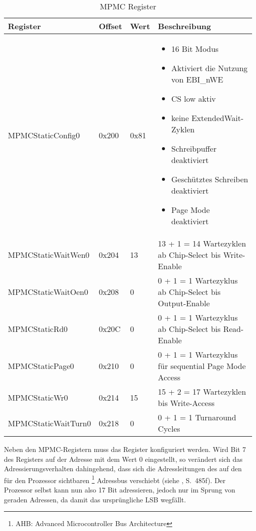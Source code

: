 \begin{table}[h]
\begin{tabular}{|p{4cm}|p{1cm}|p{1cm}|p{6.6cm}|}\hline
\rowcolor{TableBackgroundColor} 
	\textbf{Register} 	& \textbf{Offset} 	& \textbf{Wert} & \textbf{Beschreibung} 							\\ \hline
	MPMCStaticConfig0 	& 0x200 		& 0x81 			& \begin{itemize}
	\item 16 Bit Modus \item Aktiviert die Nutzung von EBI\_nWE \item  CS low aktiv\item  keine ExtendedWait-Zyklen\item  Schreibpuffer deaktiviert\item  Geschütztes Schreiben deaktiviert \item Page Mode deaktiviert 	\end{itemize} 	\\ \hline
	MPMCStaticWaitWen0 	& 0x204 		& 13 			& 13 + 1 = 14 Wartezyklen ab Chip-Select bis Write-Enable 	\\ \hline
	MPMCStaticWaitOen0 	& 0x208 		& 0 			& 0 + 1 = 1 Wartezyklus ab Chip-Select bis Output-Enable  												\\ \hline
	MPMCStaticRd0 		& 0x20C 		& 0 			& 0 + 1 = 1 Wartezyklus ab Chip-Select bis Read-Enable					\\ \hline
	MPMCStaticPage0 	& 0x210 		& 0 			& 0 + 1 = 1 Wartezyklus für sequential Page Mode Access												\\ \hline
	MPMCStaticWr0 		& 0x214 		& 15 			& 15 + 2  = 17 Wartezyklen bis Write-Access	\\ \hline
	MPMCStaticWaitTurn0 & 0x218 		& 0 			& 0 + 1 = 1 Turnaround Cycles 								\\ \hline
\end{tabular}
\caption{MPMC Register}
\label{tab:mpmc_config}
\end{table}
\newpage

Neben den MPMC-Registern muss das Register  konfiguriert werden. Wird Bit 7 des Registers  auf der Adresse  mit dem Wert 0 eingestellt, so verändert sich das Adressierungsverhalten dahingehend, dass sich die Adressleitungen des   auf den für den Prozessor sichtbaren \footnote{AHB: Advanced Microcontroller Bus Architecture} Adressbus  verschiebt (siehe \cite{NXP2010}, S.~485f). Der Prozessor selbst kann nun also 17 Bit adressieren, jedoch nur im Sprung von geraden Adressen, da damit das ursprüngliche LSB wegfällt.


